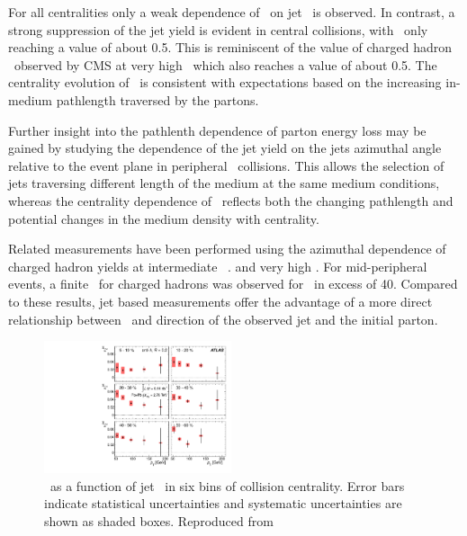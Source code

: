 For all centralities only a weak dependence of \Rcp\ on jet \pT\ is observed.
In contrast, a strong suppression of the jet yield is evident in
central collisions, with \Rcp\ only reaching a value of about 0.5.
This is reminiscent of the value of charged hadron \Raa\ observed
by CMS at very high \pT\, which also reaches a value of about 0.5.
The centrality evolution of \Rcp\ is consistent with expectations
based on the increasing in-medium pathlength traversed by the partons.

Further insight into the pathlenth dependence of parton energy
loss may be gained by studying the dependence of the jet yield
on the jets azimuthal angle relative to the event plane
in peripheral \PbPb\ collisions. This allows the selection of jets
traversing different length of the medium at the same medium
conditions, whereas the centrality dependence of \Rcp\ reflects
both the changing pathlength and potential changes in the medium
density with centrality.

Related measurements have been performed using the azimuthal dependence
of charged hadron yields at intermediate \pT\
\cite{Adams:2004wz,Adler:2006bw,Adare:2010sp, ATLAS:2011ah, Abelev:2012di}.
and very high \pT \cite{Chatrchyan:2012xq}. For mid-peripheral events,
a finite \vtwo\ for charged hadrons was observed for \pT\ in excess of 40\GeVc.
Compared to these results, jet based measurements offer the advantage
of a more direct relationship between \pT\ and direction of the observed
jet and the initial parton.

\begin{figure}[!th]
\begin{center}
\includegraphics[width=0.49\textwidth]{jetfigures/ATLAS_jetv2.pdf}
\caption{\vtjet\ as a function of jet \pT\ in six bins of 
collision centrality.
Error bars indicate statistical uncertainties and 
systematic uncertainties are shown as shaded boxes. Reproduced from~\cite{}}
\label{fig:GR:ATLAS_jet_v2}
\end{center}
\end{figure}

